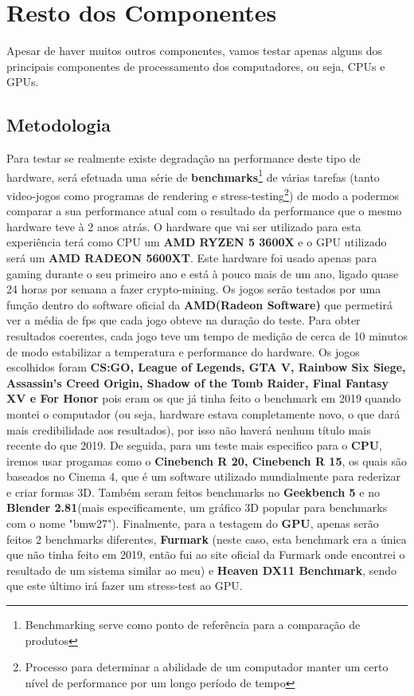\documentclass{report}
\begin{document}
\section{Resto dos Componentes}
\label{sect.Resto dos Componentes}	
	Apesar de haver muitos outros componentes, vamos testar apenas alguns dos principais componentes de processamento dos computadores, ou seja, \ac{CPU}s e \ac{GPU}s.
	
\subsection{Metodologia}
\label{subsect.Metodologia}
	Para testar se realmente existe degradação na performance deste tipo de hardware, será efetuada uma série de \textbf{ benchmarks}\footnote{Benchmarking serve como ponto de referência para a comparação de produtos} de várias tarefas (tanto video-jogos como programas de rendering e stress-testing\footnote{Processo para determinar a abilidade de um computador manter um certo nível de performance por um longo período de tempo}) de modo a podermos comparar a sua performance atual com o resultado da performance que o mesmo hardware teve à 2 anos atrás. O hardware que vai ser utilizado para esta experiência terá como \ac{CPU} um \textbf{AMD RYZEN 5 3600X} e o \ac{GPU} utilizado será um \textbf{AMD RADEON 5600XT}. Este hardware foi usado apenas para gaming durante o seu primeiro ano e está à pouco mais de um ano, ligado quase 24 horas por semana a fazer crypto-mining.
	Os jogos serão testados por uma função dentro do software oficial da \textbf{AMD(Radeon Software)} que permetirá ver a média de \ac{fps} que cada jogo obteve na duração do teste. Para obter resultados coerentes, cada jogo teve um tempo de medição de cerca de 10 minutos de modo estabilizar a temperatura e performance do hardware. Os jogos escolhidos foram \textbf{CS:GO, League of Legends, GTA V, Rainbow Six Siege, Assassin's Creed Origin, Shadow of the Tomb Raider, Final Fantasy XV e For Honor} pois eram os que já tinha feito o benchmark em 2019 quando montei o computador (ou seja, hardware estava completamente novo, o que dará mais credibilidade aos resultados), por isso não haverá nenhum título mais recente do que 2019. 
	De seguida, para um teste mais especifico para o \textbf{\ac{CPU}}, iremos usar progamas como o \textbf{Cinebench R 20, Cinebench R 15}, os quais são baseados no Cinema 4, que é um software utilizado mundialmente para rederizar e criar formas 3D. Também seram feitos benchmarks no \textbf{Geekbench 5} e no \textbf{Blender 2.81}(mais especificamente, um gráfico 3D popular para benchmarks com o nome "bmw27").
	Finalmente, para a testagem do \textbf{\ac{GPU}}, apenas serão feitos 2 benchmarks diferentes, \textbf{Furmark} (neste caso, esta benchmark era a única que não tinha feito em 2019, então fui ao site oficial da Furmark onde encontrei o resultado de um sistema similar ao meu) e \textbf{Heaven DX11 Benchmark}, sendo que este último irá fazer um stress-test ao \ac{GPU}.
	
\end{document}
